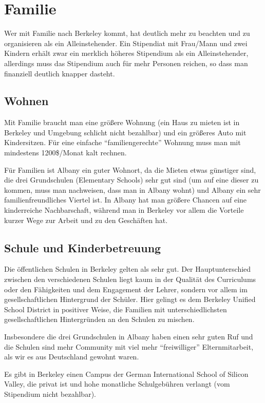 \documentclass[a4paper]{scrreprt}
\begin{document}
\chapter{Familie}

Wer mit Familie nach Berkeley kommt, hat deutlich mehr zu beachten und zu organisieren als ein Alleinstehender. Ein Stipendiat mit Frau/Mann und zwei Kindern erhält zwar ein merklich höheres Stipendium als ein Alleinstehender, allerdings muss das Stipendium auch für mehr Personen reichen, so dass man finanziell deutlich knapper dasteht.


\section{Wohnen}

Mit Familie braucht man eine größere Wohnung (ein Haus zu mieten ist in Berkeley und Umgebung schlicht nicht bezahlbar) und ein größeres Auto mit Kindersitzen. Für eine einfache "`familiengerechte"' Wohnung muss man mit  mindestens 1200\$/Monat kalt rechnen.

Für Familien ist Albany ein guter Wohnort, da die Mieten etwas günstiger sind, die drei Grundschulen (Elementary Schools) sehr gut sind (um auf eine dieser zu kommen, muss man nachweisen, dass man in Albany wohnt) und Albany ein sehr familienfreundliches Viertel ist. In Albany hat man größere Chancen auf eine kinderreiche Nachbarschaft, während man in Berkeley vor allem die Vorteile kurzer Wege zur Arbeit und zu den Geschäften hat.


\section{Schule und Kinderbetreuung}

Die öffentlichen Schulen in Berkeley gelten als sehr gut. Der Hauptunterschied zwischen den verschiedenen Schulen liegt kaum in der Qualität des Curriculums oder den Fähigkeiten und dem Engagement der Lehrer, sondern vor allem im gesellschaftlichen Hintergrund der Schüler. Hier gelingt es dem Berkeley Unified School District in positiver Weise, die Familien mit unterschiedlichsten gesellschaftlichen Hintergründen an den Schulen zu mischen.

Insbesondere die drei Grundschulen in Albany haben einen sehr guten Ruf und die Schulen sind mehr Community mit viel mehr "`freiwilliger"' Elternmitarbeit, als wir es aus Deutschland gewohnt waren.

Es gibt in Berkeley einen Campus der German International School of Silicon Valley, die privat ist und hohe monatliche Schulgebühren verlangt (vom Stipendium nicht bezahlbar).
\end{document}
